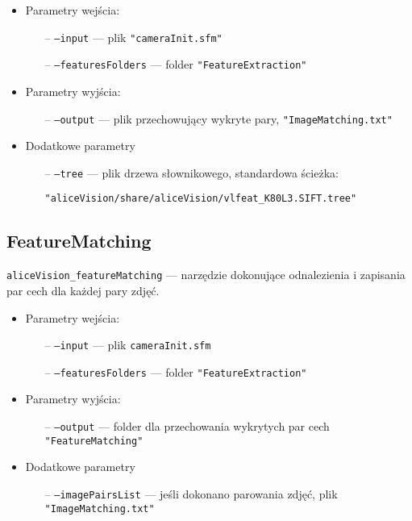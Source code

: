\begin{itemize}
   \item Parametry wejścia:
   \begin{itemize}
      \item[--] \texttt{--input} --- plik \texttt{"cameraInit.sfm"}
      \item[--] \texttt{--featuresFolders} --- folder \texttt{"FeatureExtraction"}
   \end{itemize}

   \item Parametry wyjścia:
   \begin{itemize}
      \item[--] \texttt{--output} --- plik przechowujący wykryte pary, \texttt{"ImageMatching.txt"}
   \end{itemize}

   \item Dodatkowe parametry
   \begin{itemize}
      \item[--] \texttt{--tree} --- plik drzewa słownikowego, standardowa ścieżka:

      \texttt{"aliceVision/share/aliceVision/vlfeat\_K80L3.SIFT.tree"}
   \end{itemize}
\end{itemize}

\subsection{FeatureMatching}

\texttt{aliceVision\_featureMatching} --- narzędzie dokonujące odnalezienia i zapisania par cech dla każdej pary zdjęć.

\begin{itemize}
   \item Parametry wejścia:
   \begin{itemize}
      \item[--] \texttt{--input} --- plik \texttt{cameraInit.sfm}
      \item[--] \texttt{--featuresFolders} --- folder \texttt{"FeatureExtraction"}
   \end{itemize}

   \item Parametry wyjścia:
   \begin{itemize}
      \item[--] \texttt{--output} --- folder dla przechowania wykrytych par cech \texttt{"FeatureMatching"}
   \end{itemize}

   \item Dodatkowe parametry
   \begin{itemize}
      \item[--] \texttt{--imagePairsList} --- jeśli dokonano parowania zdjęć, plik \texttt{"ImageMatching.txt"}
   \end{itemize}
\end{itemize}

